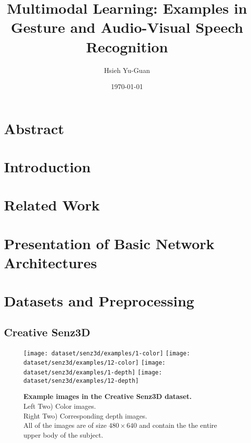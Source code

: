 

\title{Multimodal Learning: Examples in Gesture and Audio-Visual
Speech Recognition\vspace{-0.5em}}
\author{Hsieh Yu-Guan}
\date{\today}
\maketitle

\section*{Abstract}

\section{Introduction}

\section{Related Work}

\section{Presentation of Basic Network Architectures}

\section{Datasets and Preprocessing}

\subsection{Creative Senz3D}

\begin{figure}[H]
  \centering
  \hfill
  \texttt{[image: dataset/senz3d/examples/1-color]}
  \hfill
  \texttt{[image: dataset/senz3d/examples/12-color]}
  \hfill
  \texttt{[image: dataset/senz3d/examples/1-depth]}
  \hfill
  \texttt{[image: dataset/senz3d/examples/12-depth]}
  \caption{%
    \textbf{Example images in the Creative Senz3D dataset.}\\[0.1em]
    Left Two) Color images.\\[0.1em]
    Right Two) Corresponding depth images.\\[0.1em]
    All of the images are of size $480 \times 640$ and contain the
      the entire upper body of the subject.}
  \label{fig:senz3d_exs}
\end{figure}

